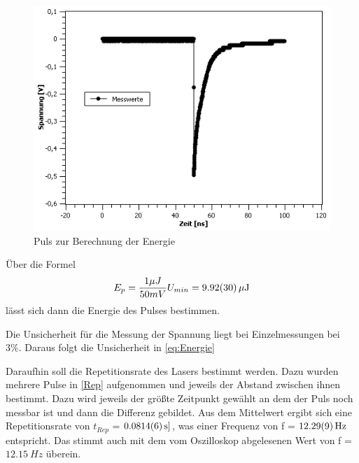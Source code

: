 \documentclass[
	a4paper,
	12pt,
	pagesize,
	ngerman
]{scrartcl}
\begin{document}
\begin{figure}[h!]
	\centering
	\includegraphics[scale=0.7]{Energie.png}
	\caption{Puls zur Berechnung der Energie}
	\label{Energie}
\end{figure}

Über die Formel
\begin{equation}
E_{p} = \dfrac{1 \mu J}{50mV}U_{min} = \SI{9,92 \pm 0,30}{\mu J} 
\label{eq:Energie}
\end{equation}
lässt sich dann die Energie des Pulses bestimmen.

Die Unsicherheit für die Messung der Spannung liegt bei Einzelmessungen bei 3\%. Daraus folgt die Unsicherheit in \cref{eq:Energie}

Daraufhin soll die Repetitionsrate des Lasers bestimmt werden. Dazu wurden mehrere Pulse in \cref{Rep} aufgenommen und jeweils der Abstand zwischen ihnen bestimmt. Dazu wird jeweils der größte Zeitpunkt gewählt an dem der Puls noch messbar ist und dann die Differenz gebildet. Aus dem Mittelwert ergibt sich eine Repetitionsrate von $t_{Rep}$ = $\SI{0,0814 \pm 0,0006}{s]}$, was einer Frequenz von f = $\SI{12,29 \pm 0,09}{Hz}$ entspricht. Das stimmt auch mit dem vom Oszilloskop abgelesenen Wert von f = $\SI{12,15}{Hz}$ überein.
\end{document}
